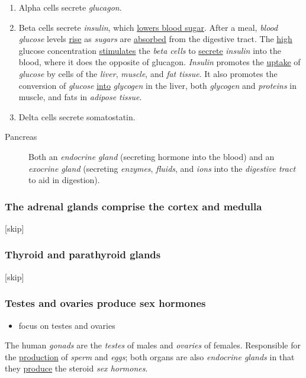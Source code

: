 \documentclass[11pt]{article}
\begin{document}
\begin{enumerate}
\item Alpha cells secrete \emph{glucagon}.
\item Beta cells secrete \emph{insulin}, which \uline{lowers blood sugar}. After a meal, \emph{blood
glucose} levels \uline{rise} as \emph{sugars} are \uline{absorbed} from the digestive tract. The \uline{high}
glucose concentration \uline{stimulates} the \emph{beta cells} to \uline{secrete} \emph{insulin} into the
blood, where it does the opposite of glucagon. \emph{Insulin} promotes the \uline{uptake} of
\emph{glucose} by cells of the \emph{liver}, \emph{muscle}, and \emph{fat tissue}. It also promotes the
conversion of \emph{glucose} \uline{into} \emph{glycogen} in the liver, both \emph{glycogen} and \emph{proteins}
in muscle, and fats in \emph{adipose tissue}.
\item Delta cells secrete somatostatin.
\end{enumerate}


\begin{description}
\item[{Pancreas}] Both an \emph{endocrine gland} (secreting hormone into the blood) and an
\emph{exocrine gland} (secreting \emph{enzymes}, \emph{fluids}, and \emph{ions} into the \emph{digestive
tract} to aid in digestion).
\end{description}

\subsubsection{The adrenal glands comprise the cortex and medulla}
\label{sec:org7a894c6}
[skip]

\subsubsection{Thyroid and parathyroid glands}
\label{sec:orgfa8a125}
[skip]

\subsubsection{Testes and ovaries produce sex hormones}
\label{sec:org719945e}
\begin{itemize}
\item focus on testes and ovaries
\end{itemize}

The human \emph{gonads} are the \emph{testes} of males and \emph{ovaries} of females. Responsible for
the \uline{production} of \emph{sperm} and \emph{eggs}; both organs are also \emph{endocrine glands} in that
they \uline{produce} the steroid \emph{sex hormones}.
\end{document}
